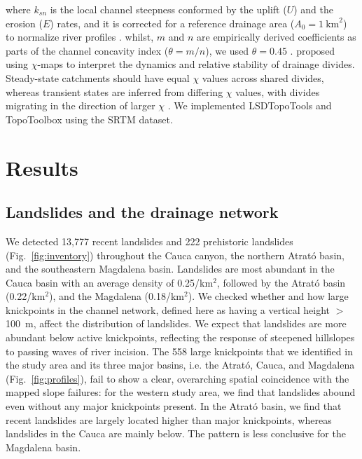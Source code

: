 \documentclass[draft]{agujournal2019}
\begin{document}
where $k_{sn}$ is the local channel steepness conformed by the uplift ($U$) and the erosion ($E$) rates, and it is corrected for a reference drainage area ($A_0=1~\mathrm{km}^2$) to normalize river profiles  \cite{whipple2017}. whilst, $m$ and $n$ are empirically derived coefficients as parts of the channel concavity index ($\theta=m/n$), we used $\theta=0.45$ \cite{Wobus2006}.  proposed using $\chi$-maps to interpret the dynamics and relative stability of drainage divides. Steady-state catchments should have equal $\chi$ values across shared divides, whereas transient states are inferred from differing $\chi$ values, with divides migrating in the direction of larger $\chi$ \cite{Willett2014}. We implemented LSDTopoTools \cite{Mudd2014} and TopoToolbox \cite{Schwanghart_2014} using the SRTM dataset.


\section{Results}

\subsection{Landslides and the drainage network}

\par We detected 13,777 recent landslides and 222 prehistoric landslides (Fig.~\ref{fig:inventory}) throughout the Cauca canyon, the northern Atrató basin, and the southeastern Magdalena basin. Landslides are most abundant in the Cauca basin with an average density of 0.25/km$^{2}$, followed by the Atrató basin (0.22/km$^{2}$), and the Magdalena (0.18/km$^{2}$). We checked whether and how large knickpoints in the channel network, defined here as having a vertical height $>$100~m, affect the distribution of landslides. We expect that landslides are more abundant below active knickpoints, reflecting the response of steepened hillslopes to passing waves of river incision. The 558 large knickpoints that we identified in the study area and its three major basins, i.e. the Atrató, Cauca, and Magdalena (Fig.~\ref{fig:profiles}), fail to show a clear, overarching spatial coincidence with the mapped slope failures: for the western study area, we find that landslides abound even without any major knickpoints present. In the Atrató basin, we find that recent landslides are largely located higher than major knickpoints, whereas landslides in the Cauca are mainly below. The pattern is less conclusive for the Magdalena basin.
\end{document}
